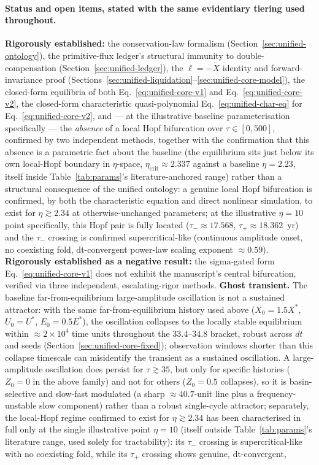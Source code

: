 \documentclass[twocolumn,10pt]{article}
\begin{document}
\paragraph{Status and open items, stated with the same evidentiary tiering used throughout.} \textbf{Rigorously established:} the conservation-law formalism (Section~\ref{sec:unified-ontology}), the primitive-flux ledger's structural immunity to double-compensation (Section~\ref{sec:unified-ledger}), the $\ell=-\dot X$ identity and forward-invariance proof (Sections~\ref{sec:unified-liquidation}--\ref{sec:unified-core-model}), the closed-form equilibria of both Eq.~\eqref{eq:unified-core-v1} and Eq.~\eqref{eq:unified-core-v2}, the closed-form characteristic quasi-polynomial Eq.~\eqref{eq:unified-char-eq} for Eq.~\eqref{eq:unified-core-v2}, and --- at the illustrative baseline parameterisation specifically --- the \emph{absence} of a local Hopf bifurcation over $\tau\in[0,500]$, confirmed by two independent methods, together with the confirmation that this absence is a parametric fact about the baseline (the equilibrium sits just below its own local-Hopf boundary in $\eta$-space, $\eta_{\text{crit}}\approx2.337$ against a baseline $\eta=2.23$, itself inside Table~\ref{tab:params}'s literature-anchored range) rather than a structural consequence of the unified ontology: a genuine local Hopf bifurcation is confirmed, by both the characteristic equation and direct nonlinear simulation, to exist for $\eta\gtrsim2.34$ at otherwise-unchanged parameters; at the illustrative $\eta=10$ point specifically, this Hopf pair is fully located ($\tau_-\approx17.568$, $\tau_+\approx18.362$~yr) and the $\tau_-$ crossing is confirmed supercritical-like (continuous amplitude onset, no coexisting fold, dt-convergent power-law scaling exponent $\approx0.59$). \textbf{Rigorously established as a negative result:} the sigma-gated form Eq.~\eqref{eq:unified-core-v1} does not exhibit the manuscript's central bifurcation, verified via three independent, escalating-rigor methods. \textbf{Ghost transient.} The baseline far-from-equilibrium large-amplitude oscillation is not a sustained attractor: with the same far-from-equilibrium history used above ($X_0=1.5X^*$, $U_0=U^*$, $E_0=0.5E^*$), the oscillation collapses to the locally stable equilibrium within $\approx2\times10^4$ time units throughout the $33.4$--$34.8$ bracket, robust across $dt$ and seeds (Section~\ref{sec:unified-core-fixed}); observation windows shorter than this collapse timescale can misidentify the transient as a sustained oscillation. A large-amplitude oscillation does persist for $\tau\gtrsim35$, but only for specific histories ($Z_0=0$ in the above family) and not for others ($Z_0=0.5$ collapses), so it is basin-selective and slow-fast modulated (a sharp $\approx40.7$-unit line plus a frequency-unstable slow component) rather than a robust single-cycle attractor; separately, the local-Hopf regime confirmed to exist for $\eta\gtrsim2.34$ has been characterised in full only at the single illustrative point $\eta=10$ (itself outside Table~\ref{tab:params}'s literature range, used solely for tractability): its $\tau_-$ crossing is supercritical-like with no coexisting fold, while its $\tau_+$ crossing shows genuine, dt-convergent, 
\end{document}

